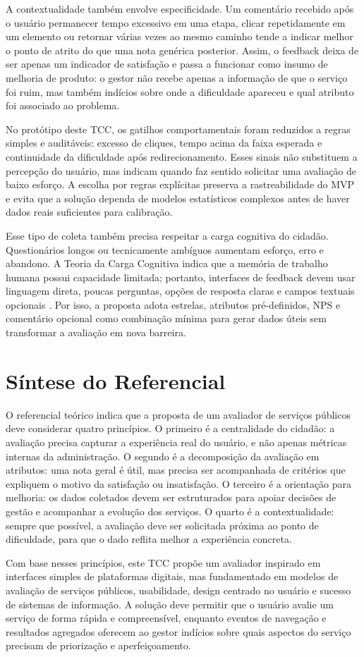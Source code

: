 A contextualidade também envolve especificidade. Um comentário recebido após o
usuário permanecer tempo excessivo em uma etapa, clicar repetidamente em um
elemento ou retornar várias vezes ao mesmo caminho tende a indicar melhor o ponto
de atrito do que uma nota genérica posterior. Assim, o feedback deixa de ser
apenas um indicador de satisfação e passa a funcionar como insumo de melhoria de
produto: o gestor não recebe apenas a informação de que o serviço foi ruim, mas
também indícios sobre onde a dificuldade apareceu e qual atributo foi associado
ao problema.

No protótipo deste TCC, os gatilhos comportamentais foram reduzidos a regras
simples e auditáveis: excesso de cliques, tempo acima da faixa esperada e
continuidade da dificuldade após redirecionamento. Esses sinais não substituem a
percepção do usuário, mas indicam quando faz sentido solicitar uma avaliação de
baixo esforço. A escolha por regras explícitas preserva a rastreabilidade do MVP
e evita que a solução dependa de modelos estatísticos complexos antes de haver
dados reais suficientes para calibração.

Esse tipo de coleta também precisa respeitar a carga cognitiva do cidadão.
Questionários longos ou tecnicamente ambíguos aumentam esforço, erro e abandono.
A Teoria da Carga Cognitiva indica que a memória de trabalho humana possui
capacidade limitada; portanto, interfaces de feedback devem usar linguagem
direta, poucas perguntas, opções de resposta claras e campos textuais opcionais
\cite{sweller1988cognitiveLoad}. Por isso, a proposta adota estrelas, atributos
pré-definidos, NPS e comentário opcional como combinação mínima para gerar dados
úteis sem transformar a avaliação em nova barreira.

\section{Síntese do Referencial}

O referencial teórico indica que a proposta de um avaliador de serviços públicos
deve considerar quatro princípios. O primeiro é a centralidade do cidadão: a
avaliação precisa capturar a experiência real do usuário, e não apenas métricas
internas da administração. O segundo é a decomposição da avaliação em atributos:
uma nota geral é útil, mas precisa ser acompanhada de critérios que expliquem o
motivo da satisfação ou insatisfação. O terceiro é a orientação para melhoria:
os dados coletados devem ser estruturados para apoiar decisões de gestão e
acompanhar a evolução dos serviços. O quarto é a contextualidade: sempre que
possível, a avaliação deve ser solicitada próxima ao ponto de dificuldade, para
que o dado reflita melhor a experiência concreta.

Com base nesses princípios, este TCC propõe um avaliador inspirado em interfaces
simples de plataformas digitais, mas fundamentado em modelos de avaliação de
serviços públicos, usabilidade, design centrado no usuário e sucesso de sistemas
de informação. A solução deve permitir que o usuário avalie um serviço de forma
rápida e compreensível, enquanto eventos de navegação e resultados agregados
oferecem ao gestor indícios sobre quais aspectos do serviço precisam de
priorização e aperfeiçoamento.
